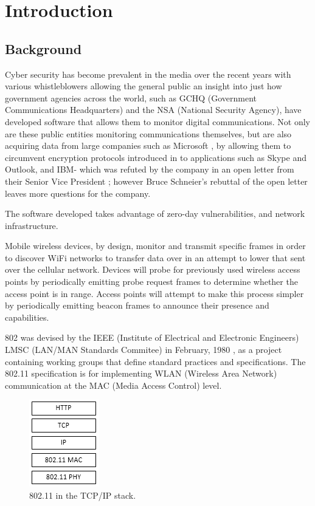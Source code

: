 \section {Introduction}
\subsection{Background}
Cyber security has become prevalent in the media over the recent years with various whistleblowers allowing the general public an insight into just how government agencies across the world, such as GCHQ (Government Communications Headquarters) and the NSA (National Security Agency), have developed software that allows them to monitor digital communications. Not only are these public entities monitoring communications themselves, but are also acquiring data from large companies such as Microsoft \cite{intro:guardian_ms_nsa}, by allowing them to circumvent encryption protocols introduced in to applications such as Skype and Outlook, and IBM- which was refuted by the company in an open letter from their Senior Vice President \cite{intro:ibm_open_letter}; however Bruce Schneier’s rebuttal \cite{intro:open_open_letter} of the open letter leaves more questions for the company.

The software developed takes advantage of zero-day vulnerabilities, and network infrastructure.

Mobile wireless devices, by design, monitor and transmit specific frames in order to discover WiFi networks to transfer data over in an attempt to lower that sent over the cellular network. Devices will probe for previously used wireless access points by periodically emitting probe request frames to determine whether the access point is in range. Access points will attempt to make this process simpler by periodically emitting beacon frames to announce their presence and capabilities.

802 was devised by the IEEE (Institute of Electrical and Electronic Engineers) LMSC (LAN/MAN Standards Commitee) in February, 1980 \cite{intro:ieee_decrypted}, as a project containing working groups that define standard practices and specifications. The 802.11 specification is for implementing WLAN (Wireless Area Network) communication at the MAC (Media Access Control) level. 

\begin{figure}[htb!]
	\centering\includegraphics{intro/diagrams/tcpip.png}
	\caption{802.11 in the TCP/IP stack.}
\end{figure}

